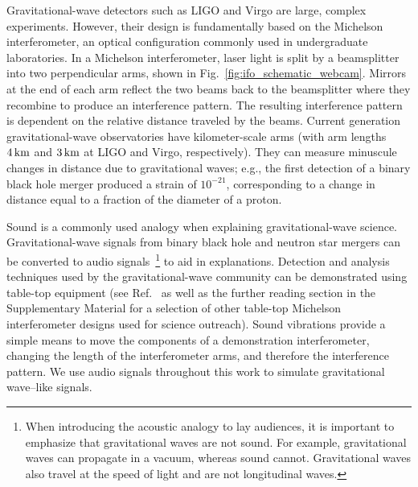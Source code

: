 \documentclass[paper-main.tex]{subfiles}
\begin{document}
Gravitational-wave detectors such as LIGO and Virgo are large, complex experiments. 
However, their design is fundamentally based on the Michelson interferometer, an optical configuration commonly used in undergraduate laboratories. 
In a Michelson interferometer, laser light is split by a beamsplitter into two perpendicular arms, shown in Fig.~\ref{fig:ifo_schematic_webcam}. 
Mirrors at the end of each arm reflect the two beams back to the beamsplitter where they recombine to produce an interference pattern.
The resulting interference pattern is dependent on the relative distance traveled by the beams. 
Current generation gravitational-wave observatories have kilometer-scale arms (with arm lengths $4\,{\rm km}$ and $3\,{\rm km}$ at LIGO and Virgo, respectively). 
They can measure minuscule changes in distance due to gravitational waves; e.g., the first detection of a binary black hole merger produced a strain of $10^{-21}$,\cite{GW150914} corresponding to a change in distance equal to a fraction of the diameter of a proton. 


Sound is a commonly used analogy when explaining gravitational-wave science. 
Gravitational-wave signals from binary black hole and neutron star mergers can be converted to audio signals~\footnote{When introducing the acoustic analogy to lay audiences, it is important to emphasize that gravitational waves are not sound. For example, gravitational waves can propagate in a vacuum, whereas sound cannot. Gravitational waves also travel at the speed of light and are not longitudinal waves.} to aid in explanations.
Detection and analysis techniques used by the gravitational-wave community can be demonstrated using table-top equipment (see Ref.~\cite{TTExhibit:2021} as well as the further reading section in the Supplementary Material for a selection of other table-top Michelson interferometer designs used for science outreach).
Sound vibrations provide a simple means to move the components of a demonstration interferometer, changing the length of the interferometer arms, and therefore the interference pattern.
We use audio signals throughout this work to simulate gravitational wave--like signals.
\end{document}
